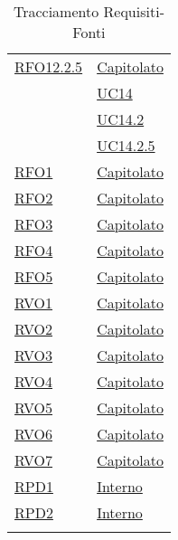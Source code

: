 \begin{longtable}{|>{\centering}m{5cm}|m{5cm}<{\centering}|}
 \hyperlink{RFO12.2.5}{RFO12.2.5} & \hyperlink{Capitolato}{Capitolato}\\
& \hyperref[UC14]{UC14}\\
& \hyperref[UC14.2]{UC14.2}\\
& \hyperref[UC14.2.5]{UC14.2.5}\\\hline

 \hyperlink{RQO1}{RFO1} & \hyperlink{Capitolato}{Capitolato}\\
\hline

 \hyperlink{RQO2}{RFO2} & \hyperlink{Capitolato}{Capitolato}\\
\hline

 \hyperlink{RQO3}{RFO3} & \hyperlink{Capitolato}{Capitolato}\\
\hline

 \hyperlink{RQO4}{RFO4} & \hyperlink{Capitolato}{Capitolato}\\
\hline

 \hyperlink{RQO5}{RFO5} & \hyperlink{Capitolato}{Capitolato}\\
\hline

 \hyperlink{RVO1}{RVO1} & \hyperlink{Capitolato}{Capitolato}\\
\hline

 \hyperlink{RVO2}{RVO2} & \hyperlink{Capitolato}{Capitolato}\\
\hline

 \hyperlink{RVO3}{RVO3} & \hyperlink{Capitolato}{Capitolato}\\
\hline

 \hyperlink{RVO4}{RVO4} & \hyperlink{Capitolato}{Capitolato}\\
\hline

 \hyperlink{RVO5}{RVO5} & \hyperlink{Capitolato}{Capitolato}\\
\hline

 \hyperlink{RVO6}{RVO6} & \hyperlink{Capitolato}{Capitolato}\\
\hline

 \hyperlink{RVO7}{RVO7} & \hyperlink{Capitolato}{Capitolato}\\
\hline

 \hyperlink{RPD1}{RPD1} & \hyperlink{Interno}{Interno}\\
\hline

 \hyperlink{RPD2}{RPD2} & \hyperlink{Interno}{Interno}\\
\hline










 



\caption[Tracciamento Requisiti-Fonti]{Tracciamento Requisiti-Fonti}
\label{tabella:requi-fonti}
\end{longtable}
\clearpage
